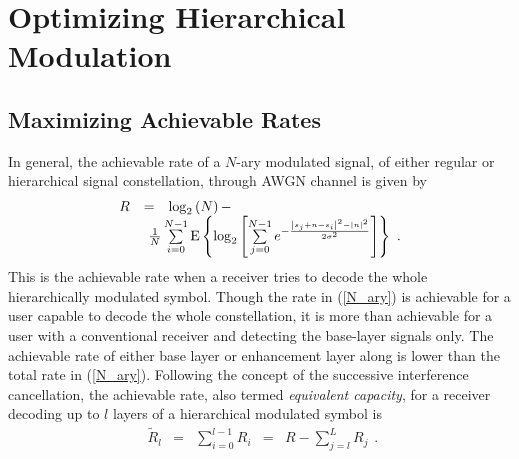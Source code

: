 \documentclass[conference]{IEEEtran}
\begin{document}
\section{Optimizing Hierarchical Modulation}
\subsection{Maximizing Achievable Rates~\label{Info_Theory}}
In general, the achievable rate of a $N$-ary modulated signal, of
either regular or hierarchical signal constellation, through AWGN
channel is given by~\cite{Unge82}
\begin{equation}
\begin{array}{lcl}
R&=&\log_{2}\left(N\right)-\\
&&\hspace{-0.20in}\frac{1}{N}\sum\limits_{i=0}^{N-1}\mbox{E}\left\{\log_{2}\left[\sum\limits_{j=0}^{N-1}e^{-\frac{\left|s_{j}+n-s_{i}\right|^2-\left|n\right|^2}{2\sigma^2}}\right]\right\}\
.
\end{array}\label{N_ary}
\end{equation}
\noindent This is the achievable rate when a receiver tries to
decode the whole hierarchically modulated symbol. Though the rate
in (\ref{N_ary}) is achievable for a user capable to decode the
whole constellation, it is more than achievable for a user with a
conventional receiver and detecting the base-layer signals only.
The achievable rate of either base layer or enhancement layer
along is lower than the total rate in (\ref{N_ary}). Following the
concept of the successive interference cancellation, the
achievable rate, also termed {\em equivalent capacity}, for a
receiver decoding up to $l$ layers of a hierarchical modulated
symbol is~\cite{Huber94}
\begin{equation}
\begin{array}{rcccl}
\tilde{R}_{l}&=&\sum\limits_{i=0}^{l-1}R_{i}& = &
R-\sum\limits_{j=l}^{L}{R}_{j}
\end{array}.\label{R_equiv}
\end{equation}
\end{document}
